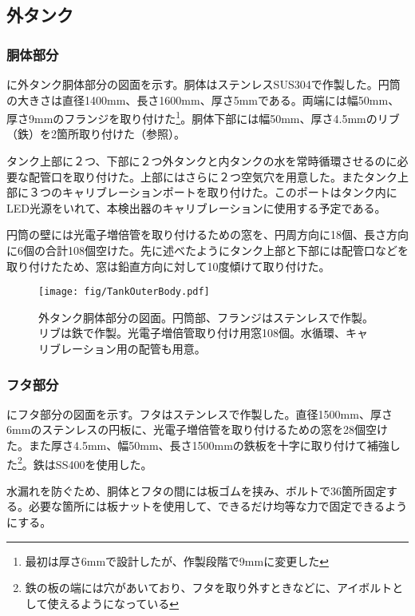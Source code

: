 \subsection{外タンク}

\subsubsection{胴体部分}

に外タンク胴体部分の図面を示す。胴体はステンレスSUS304で作製した。円筒の大きさは直径1400mm、長さ1600mm、厚さ5mmである。両端には幅50mm、厚さ9mmのフランジを取り付けた\footnote{最初は厚さ6mmで設計したが、作製段階で9mmに変更した}。胴体下部には幅50mm、厚さ4.5mmのリブ（鉄）を2箇所取り付けた（参照）。

タンク上部に２つ、下部に２つ外タンクと内タンクの水を常時循環させるのに必要な配管口を取り付けた。上部にはさらに２つ空気穴を用意した。またタンク上部に３つのキャリブレーションポートを取り付けた。このポートはタンク内にLED光源をいれて、本検出器のキャリブレーションに使用する予定である。

円筒の壁には光電子増倍管を取り付けるための窓を、円周方向に18個、長さ方向に6個の合計108個空けた。先に述べたようにタンク上部と下部には配管口などを取り付けたため、窓は鉛直方向に対して10度傾けて取り付けた。



\begin{figure}[htbp]
\centering
\texttt{[image: fig/TankOuterBody.pdf]}
\caption[外タンク胴体部分の図面]{外タンク胴体部分の図面。円筒部、フランジはステンレスで作製。リブは鉄で作製。光電子増倍管取り付け用窓108個。水循環、キャリブレーション用の配管も用意。}
\label{TankOuterBody}
\end{figure}

\subsubsection{フタ部分}
にフタ部分の図面を示す。フタはステンレスで作製した。直径1500mm、厚さ6mmのステンレスの円板に、光電子増倍管を取り付けるための窓を28個空けた。また厚さ4.5mm、幅50mm、長さ1500mmの鉄板を十字に取り付けて補強した\footnote{鉄の板の端には穴があいており、フタを取り外すときなどに、アイボルトとして使えるようになっている}。鉄はSS400を使用した。

水漏れを防ぐため、胴体とフタの間には板ゴムを挟み、ボルトで36箇所固定する。必要な箇所には板ナットを使用して、できるだけ均等な力で固定できるようにする。

